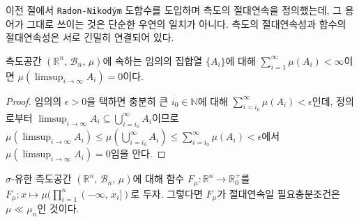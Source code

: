 이전 절에서 \texttt{Radon-Nikod\'ym} 도함수를 도입하며 측도의 절대연속을 정의했는데, 그 용어가 그대로 쓰이는 것은 단순한 우연의 일치가 아니다. 측도의 절대연속성과 함수의 절대연속성은 서로 긴밀히 연결되어 있다.

\begin{theorem}
    측도공간 $(\mathbb{R}^n,\,\mathcal{B}_n,\,\mu)$에 속하는 임의의 집합열 $\{A_i\}$에 대해 $\sum_{i=1}^\infty\mu(A_i)<\infty$이면 $\mu(\limsup_{i\to\infty}A_i)=0$이다.
\end{theorem}

\begin{proof}
    임의의 $\epsilon>0$을 택하면 충분히 큰 $i_0\in\mathbb{N}$에 대해 $\sum_{i=i_0}^\infty\mu(A_i)<\epsilon$인데, 정의로부터 $\limsup_{i\to\infty}A_i\subseteq\bigcup_{i=i_0}^\infty A_i$이므로 $\mu(\limsup_{i\to\infty}A_i)\leq\mu(\bigcup_{i=i_0}^\infty A_i)\leq\sum_{i=i_0}^\infty\mu(A_i)<\epsilon$에서 $\mu(\limsup_{i\to\infty}A_i)=0$임을 안다.
\end{proof}

\begin{theorem}\label{thm:AbsContiRel}
    $\sigma$-유한 측도공간 $(\mathbb{R}^n,\,\mathcal{B}_n,\,\mu)$에 대해 함수 $F_\mu:\mathbb{R}^n\to\mathbb{R}^+_0$를 $F_\mu:x\mapsto\mu(\prod_{i=1}^n(-\infty,\,x_i])$로 두자. 그렇다면 $F_\mu$가 절대연속일 필요충분조건은 $\mu\ll\mu_n$인 것이다.
\end{theorem}

